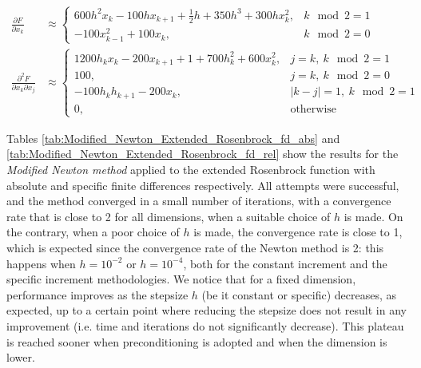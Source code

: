 \begin{align*}
    \frac{\partial F}{\partial x_k} &\approx \left \{ \begin{array}{ll}
        600h^2 x_k - 100hx_{k+1} + \frac12h + 350h^3 + 300hx_k^2, & k\mod 2 = 1\\
        -100x_{k-1}^2 + 100x_k, & k\mod 2 = 0
    \end{array} \right .\\
    \frac{\partial^2 F}{\partial x_k \partial x_j} &\approx \left \{ \begin{array}{ll}
        1200h_k x_k - 200x_{k+1} + 1 + 700h_k^2 + 600x_k^2, & j = k,\ k\mod 2 = 1\\
        100, & j = k,\ k\mod 2 = 0\\
        -100 h_k h_{k+1} - 200 x_k, & \lvert k-j \rvert = 1,\ k\mod 2 = 1\\
        0, & \text{otherwise}
    \end{array} \right .
\end{align*}

Tables \ref{tab:Modified_Newton_Extended_Rosenbrock_fd_abs} and \ref{tab:Modified_Newton_Extended_Rosenbrock_fd_rel} show the results for the \textit{Modified Newton method} applied to the extended Rosenbrock function with absolute and specific finite differences respectively.
All attempts were successful, and the method converged in a small number of iterations, with a convergence rate that is close to 2 for all dimensions, when a suitable choice of $h$ is made.
On the contrary, when a poor choice of $h$ is made, the convergence rate is close to 1, which is expected since the convergence rate of the Newton method is 2: this happens when $h=10^{-2}$ or $h=10^{-4}$, both for the constant increment and the specific increment methodologies.
We notice that for a fixed dimension, performance improves as the stepsize $h$ (be it constant or specific) decreases, as expected, up to a certain point where reducing the stepsize does not result in any improvement (i.e. time and iterations do not significantly decrease).
This plateau is reached sooner when preconditioning is adopted and when the dimension is lower.

